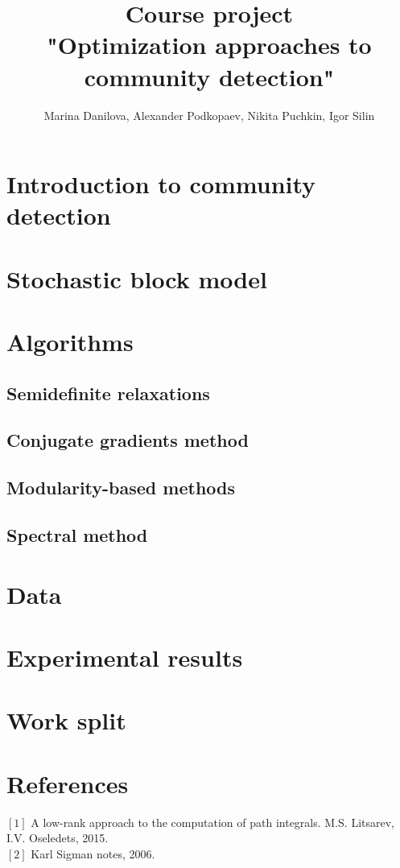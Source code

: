 \documentclass[11pt,a4paper]{extarticle}
\title{Course project \\
"Optimization approaches to community detection"}
\author{ Marina Danilova, Alexander Podkopaev, Nikita Puchkin, Igor Silin }
\begin{document}
\maketitle

\section{Introduction to community detection}

\section{Stochastic block model}

\section{Algorithms}
	
	\subsection{Semidefinite relaxations}
	\subsection{Conjugate gradients method}
	\subsection{Modularity-based methods}
	\subsection{Spectral method}

\section{Data}

\section{Experimental results}

\section{Work split}


\section{References}
     $[1]$  A low-rank approach to the computation of path integrals. M.S. Litsarev, I.V. Oseledets, 2015.\\
     $[2]$ Karl Sigman notes, 2006.\\
\end{document}
